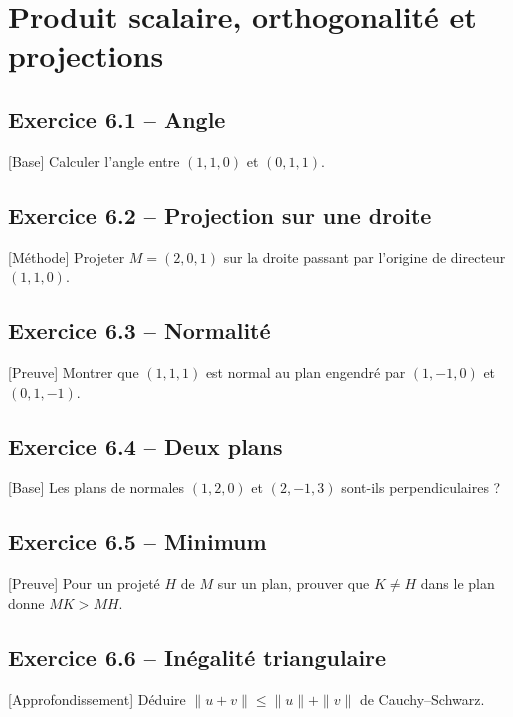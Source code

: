 \chapter{Produit scalaire, orthogonalité et projections}
\section*{Exercice 6.1 -- Angle}
[Base] Calculer l'angle entre $(1,1,0)$ et $(0,1,1)$.

\section*{Exercice 6.2 -- Projection sur une droite}
[Méthode] Projeter $M=(2,0,1)$ sur la droite passant par l'origine de directeur $(1,1,0)$.

\section*{Exercice 6.3 -- Normalité}
[Preuve] Montrer que $(1,1,1)$ est normal au plan engendré par $(1,-1,0)$ et $(0,1,-1)$.

\section*{Exercice 6.4 -- Deux plans}
[Base] Les plans de normales $(1,2,0)$ et $(2,-1,3)$ sont-ils perpendiculaires ?

\section*{Exercice 6.5 -- Minimum}
[Preuve] Pour un projeté $H$ de $M$ sur un plan, prouver que $K\ne H$ dans le plan donne $MK>MH$.

\section*{Exercice 6.6 -- Inégalité triangulaire}
[Approfondissement] Déduire $\|u+v\|\le\|u\|+\|v\|$ de Cauchy--Schwarz.
